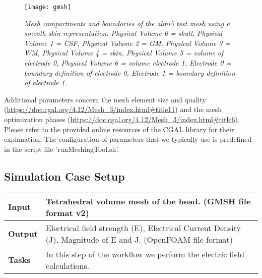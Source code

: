 \begin{figure}[H]
   \centering
   \texttt{[image: gmsh]}
   \caption{\emph{Mesh compartments and boundaries of the almi5 test mesh using a smooth skin
    representation. Physical Volume 0 = skull,
    Physical Volume 1 = CSF, Physical Volume 2 = GM, Physical Volume 3 = WM, Physical Volume 4 = skin,
    Physical Volume 5 = volume of electrode 0, Physical Volume 6 = volume electrode 1, Electrode 0 =
    boundary definition of electrode 0, Electrode 1 = boundary definition of electrode 1.}}
\end{figure}
Additional parameters concern the mesh element size and quality (\url{https://doc.cgal.org/4.12/Mesh_3/index.html#title11})
and the mesh optimization phases (\url{https://doc.cgal.org/4.12/Mesh_3/index.html#title6}). Please refer
to the provided online resources of the CGAL library for their explanation. The configuration of 
parameters that we typically use is predefined in the script file 'runMeshingTool.sh'.

\subsection{Simulation Case Setup}
\begin{tabular}{ | p{} || p{} | }
    \hline
    \textbf{Input}  & Tetrahedral volume mesh of the head. (GMSH file format v2) \\
    \hline
    \textbf{Output} & Electrical field strength (E), Electrical Current Density (J), Magnitude of
                      E and J. (OpenFOAM file format) \\ 
    \hline
    \textbf{Tasks} & In this step of the workflow we perform the electric field calculations. \\
    \hline
\end{tabular}

\hspace{0.5cm}

